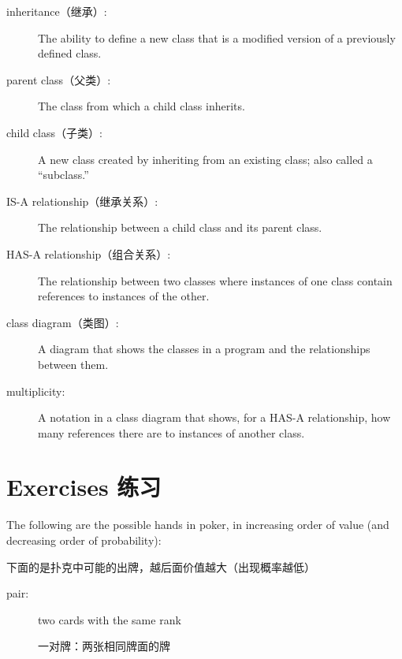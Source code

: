 \documentclass[10pt]{book}
\begin{document}
\begin{CJK}{UTF8}{gbsn}
\begin{description}
\item[inheritance（继承）:] The ability to define a new class that is a
modified version of a previously defined class.

\item[parent class（父类）:] The class from which a child class inherits.

\item[child class（子类）:] A new class created by inheriting from an
existing class; also called a ``subclass.''

\item[IS-A relationship（继承关系）:] The relationship between a child class
and its parent class.

\item[HAS-A relationship（组合关系）:] The relationship between two classes
where instances of one class contain references to instances of
the other.

\item[class diagram（类图）:] A diagram that shows the classes in a program
and the relationships between them.

\item[multiplicity:] A notation in a class diagram that shows, for
a HAS-A relationship, how many references there are to instances
of another class.

\end{description}


\section{Exercises 练习}

\begin{exercise}
\label{poker}

The following are the possible hands in poker, in increasing order
of value (and decreasing order of probability):

下面的是扑克中可能的出牌，越后面价值越大（出现概率越低）

\begin{description}

\item[pair:] two cards with the same rank
\vspace{-0.05in}

一对牌：两张相同牌面的牌


\end{description}
\end{exercise}
\end{CJK}
\end{document}
